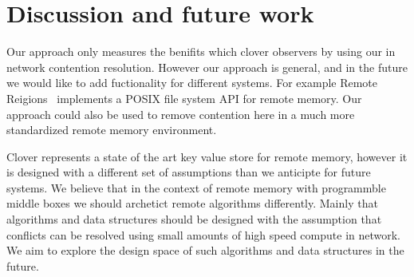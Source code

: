 \section{Discussion and future work}

Our approach only measures the benifits which clover observers by using our in
network contention resolution. However our approach is general, and in the
future we would like to add fuctionality for different systems. For example
Remote Reigions~\cite{reigons} implements a POSIX file system API for remote
memory.  Our approach could also be used to remove contention here in a much
more standardized remote memory environment.

Clover represents a state of the art key value store for remote memory, however
it is designed with a different set of assumptions than we anticipte for future
systems. We believe that in the context of remote memory with programmble middle
boxes we should archetict remote algorithms differently. Mainly that algorithms
and data structures should be designed with the assumption that conflicts can be
resolved using small amounts of high speed compute in network. We aim to explore
the design space of such algorithms and data structures in the future.